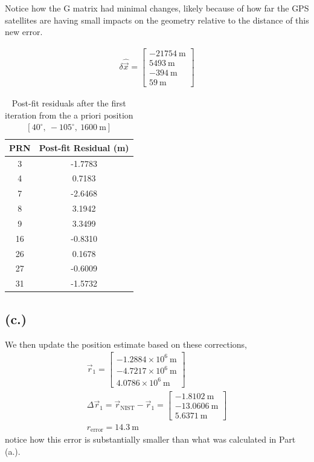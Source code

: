 \documentclass[11pt]{article}
\begin{document}
\hspace*{2em}Notice how the G matrix had minimal changes, likely because of how far the GPS satellites are having small impacts on the geometry relative to the distance of this new error.

\begin{gather*}
\delta\hat{\vec{x}} = \begin{bmatrix} -21754~\mathrm{m} \\ 5493~\mathrm{m} \\ -394~\mathrm{m} \\ 59~\mathrm{m} \end{bmatrix}
\end{gather*}

\begin{table}[h!]
    \centering
    \begin{tabular}{|c|c|}
        \hline
        \textbf{PRN} & \textbf{Post-fit Residual (m)} \\ \hline
        3  & -1.7783 \\ \hline
        4  & 0.7183 \\ \hline
        7  & -2.6468 \\ \hline
        8  & 3.1942 \\ \hline
        9  & 3.3499 \\ \hline
        16 & -0.8310 \\ \hline
        26 & 0.1678 \\ \hline
        27 & -0.6009 \\ \hline
        31 & -1.5732 \\ \hline
    \end{tabular}
    \caption{Post-fit residuals after the first iteration from the a priori position $[40^\circ,\ -105^\circ,\ 1600~\mathrm{m}]$}
    \label{tab:postfit_p3}
\end{table}

\subsection*{(c.)}
\hspace*{2em}We then update the position estimate based on these corrections, 
\begin{gather*}
\vec{r}_1 = \begin{bmatrix} -1.2884\times10^{6}~\mathrm{m} \\ -4.7217\times10^{6}~\mathrm{m} \\ 4.0786\times10^{6}~\mathrm{m} \end{bmatrix} \\
\Delta\vec{r}_1 = \vec{r}_{\mathrm{NIST}} - \vec{r}_1 = \begin{bmatrix} -1.8102~\mathrm{m} \\ -13.0606~\mathrm{m} \\ 5.6371~\mathrm{m} \end{bmatrix} \\
\boxed{r_{\mathrm{error}} = 14.3~\mathrm{m}}
\end{gather*}
notice how this error is substantially smaller than what was calculated in Part (a.).
\end{document}
